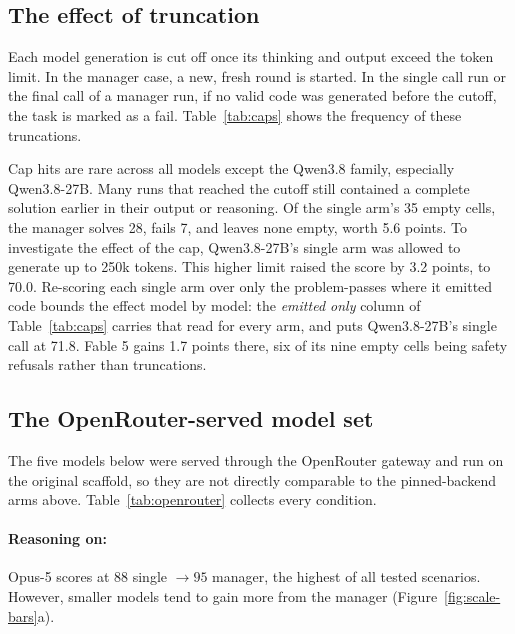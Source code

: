 \documentclass{article}
\begin{document}
\FloatBarrier
\subsection{The effect of truncation}
\label{sec:truncation}

Each model generation is cut off once its thinking and output exceed the token limit. In the manager case, a new, fresh round is started. In the single call run or the final call of a manager run, if no valid code was generated before the cutoff, the task is marked as a fail. Table~\ref{tab:caps} shows the frequency of these truncations.




Cap hits are rare across all models except the Qwen3.8 family, especially Qwen3.8-27B. Many runs that reached the cutoff still contained a complete solution earlier in their output or reasoning.
Of the single arm's 35 empty cells, the manager
solves 28, fails 7, and leaves none empty, worth 5.6 points. To investigate the effect of the cap, Qwen3.8-27B's
single arm was allowed to generate up to 250k tokens. This higher limit raised the score by 3.2
points, to 70.0. Re-scoring each single arm over only the problem-passes
where it emitted code bounds the effect model by model: the \emph{emitted only} column of
Table~\ref{tab:caps} carries that read for every arm, and puts Qwen3.8-27B's single call at 71.8.
Fable 5
gains 1.7 points there, six of its nine empty cells being safety refusals rather than
truncations.

\subsection{The OpenRouter-served model set}
\label{sec:openrouter}

The five models below were served through the OpenRouter gateway and run on the original
scaffold, so they are not directly comparable to the pinned-backend arms above.
Table~\ref{tab:openrouter} collects every condition.

\paragraph{Reasoning on:} Opus-5 scores at $88$ single $\to 95$ manager, the highest of all tested scenarios. However, smaller models tend to gain more from the manager (Figure~\ref{fig:scale-bars}a).
\end{document}

